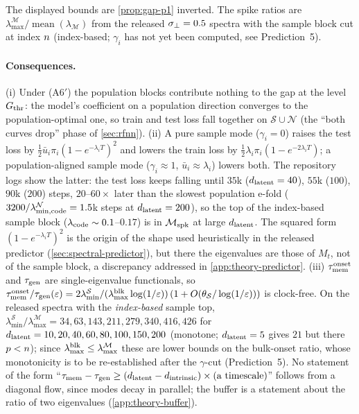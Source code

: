 \begin{definition}
\begin{enumerate}
\end{enumerate}
The displayed bounds are \cref{prop:gap-p1} inverted. The spike ratios are $\lambda^{\mathcal M}_{\max}/\operatorname{mean}(\lambda_{\mathcal M})$ from the released $\sigma_{\perp}=0.5$ spectra with the sample block cut at index $n$ (index-based; $\gamma_i$ has not yet been computed, see Prediction~5).
\end{definition}

\paragraph{Consequences.}
(i) Under (A6$'$) the population blocks contribute nothing to the gap at the level $G_{\rm thr}$: the model's coefficient on a population direction converges to the population-optimal one, so train and test loss fall together on $\mathcal S\cup\mathcal N$ (the ``both curves drop'' phase of \cref{sec:rfnn}). (ii) A pure sample mode ($\gamma_i=0$) raises the test loss by $\tfrac12\bar u_i\pi_i(1-e^{-\lambda_iT})^2$ and lowers the train loss by $\tfrac12\lambda_i\pi_i(1-e^{-2\lambda_iT})$; a population-aligned sample mode ($\gamma_i\approx1$, $\bar u_i\approx\lambda_i$) lowers both. The repository logs show the latter: the test loss keeps falling until $35$k ($d_{\mathrm{latent}}=40$), $55$k ($100$), $90$k ($200$) steps, $20$--$60\times$ later than the slowest population e-fold ($3200/\lambda^{\mathcal N}_{\min,\rm code}=1.5$k steps at $d_{\mathrm{latent}}=200$), so the top of the index-based sample block ($\lambda_{\rm code}\sim0.1$--$0.17$) is in $\mathcal M_{\rm spk}$ at large $d_{\mathrm{latent}}$. The squared form $(1-e^{-\lambda_iT})^2$ is the origin of the shape used heuristically in the released predictor (\cref{sec:spectral-predictor}), but there the eigenvalues are those of $M_t$, not of the sample block, a discrepancy addressed in \cref{app:theory-predictor}. (iii) $\tau_{\mathrm{mem}}^{\rm onset}$ and $\tau_{\mathrm{gen}}$ are single-eigenvalue functionals, so $\tau_{\mathrm{mem}}^{\rm onset}/\tau_{\mathrm{gen}}(\varepsilon)=2\lambda^{\mathcal S}_{\min}/(\lambda^{\rm blk}_{\max}\log(1/\varepsilon))\,(1+O(\theta_{\mathcal S}/\log(1/\varepsilon)))$ is clock-free. On the released spectra with the \emph{index-based} sample top, $\lambda^{\mathcal S}_{\min}/\lambda^{\mathcal M}_{\max}=34,63,143,211,279,340,416,426$ for $d_{\mathrm{latent}}=10,20,40,60,80,100,150,200$ (monotone; $d_{\mathrm{latent}}=5$ gives $21$ but there $p<n$); since $\lambda^{\rm blk}_{\max}\le\lambda^{\mathcal M}_{\max}$ these are lower bounds on the bulk-onset ratio, whose monotonicity is to be re-established after the $\gamma$-cut (Prediction~5). No statement of the form ``$\tau_{\mathrm{mem}}-\tau_{\mathrm{gen}}\ge(d_{\mathrm{latent}}-d_{\mathrm{intrinsic}})\times(\text{a timescale})$'' follows from a diagonal flow, since modes decay in parallel; the buffer is a statement about the ratio of two eigenvalues (\cref{app:theory-buffer}).

